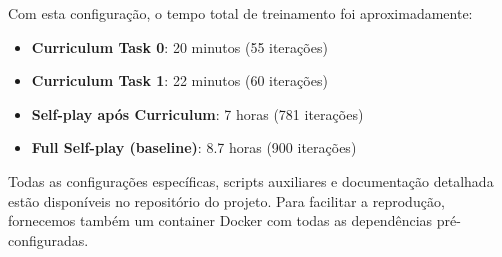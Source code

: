 Com esta configuração, o tempo total de treinamento foi aproximadamente:

\begin{itemize}
    \item \textbf{Curriculum Task 0}: 20 minutos (55 iterações)
    \item \textbf{Curriculum Task 1}: 22 minutos (60 iterações)
    \item \textbf{Self-play após Curriculum}: 7 horas (781 iterações)
    \item \textbf{Full Self-play (baseline)}: 8.7 horas (900 iterações)
\end{itemize}


Todas as configurações específicas, scripts auxiliares e documentação detalhada estão disponíveis no repositório do projeto. Para facilitar a reprodução, fornecemos também um container Docker com todas as dependências pré-configuradas.
